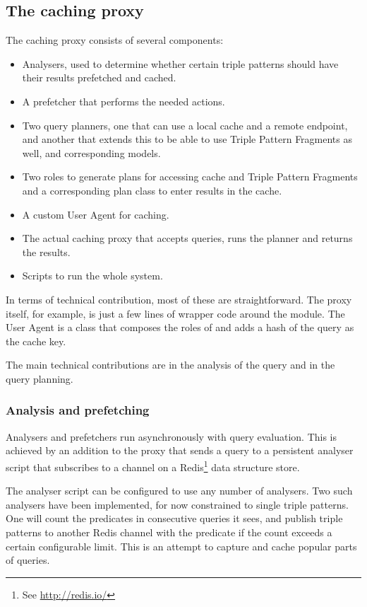 \documentclass[a4paper, 12pt]{article}
\begin{document}
\subsection{The caching proxy}\label{sec:cacher}

The caching proxy consists of several components:

\begin{itemize}
\item Analysers, used to determine whether certain triple patterns
  should have their results prefetched and cached.
\item A prefetcher that performs the needed actions.
\item Two query planners, one that can use a local cache and a remote
  endpoint, and another that extends this to be able to use Triple
  Pattern Fragments as well, and corresponding models.
\item Two roles to generate plans for accessing cache and Triple
  Pattern Fragments and a corresponding plan class to enter results
  in the cache.
\item A custom User Agent for caching.
\item The actual caching proxy that accepts queries, runs the planner
  and returns the results.
\item Scripts to run the whole system.
\end{itemize}

In terms of technical contribution, most of these are
straightforward. The proxy itself, for example, is just a few lines of
wrapper code around the  module. The User
Agent is a class that composes the roles of
 and adds a hash of the query as
the cache key.

The main technical contributions are in the analysis of the query and
in the query planning.

\subsubsection{Analysis and prefetching}\label{sec:analpre}

Analysers and prefetchers run asynchronously with query
evaluation. This is achieved by an addition to the proxy that sends a
query to a persistent analyser script that subscribes to a channel on
a Redis\footnote{See \url{http://redis.io/}} data structure store. 

The analyser script can be configured to use any number of analysers.
Two such analysers have been implemented, for now constrained to
single triple patterns. One will count the predicates in consecutive
queries it sees, and publish triple patterns to another Redis channel
with the predicate if the count exceeds a certain configurable
limit. This is an attempt to capture and cache popular parts of
queries.
\end{document}

